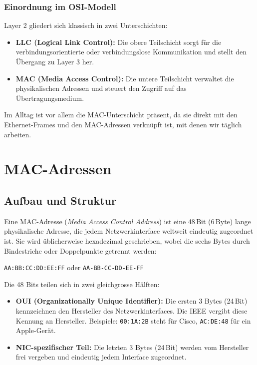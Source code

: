 \documentclass[11pt, oneside, numbers=nönddot]{scrbook}
\begin{document}
\subsubsection*{Einordnung im OSI-Modell}
Layer 2 gliedert sich klassisch in zwei Unterschichten:
\begin{itemize}
\item \textbf{LLC (Logical Link Control):} Die obere Teilschicht sorgt für die verbindungsorientierte oder verbindungslose Kommunikation und stellt den Übergang zu Layer 3 her.
\item \textbf{MAC (Media Access Control):} Die untere Teilschicht verwaltet die physikalischen Adressen und steuert den Zugriff auf das Übertragungsmedium.
\end{itemize}

Im Alltag ist vor allem die MAC-Unterschicht präsent, da sie direkt mit den Ethernet-Frames und den MAC-Adressen verknüpft ist, mit denen wir täglich arbeiten.

\newpage

\section{MAC-Adressen}
\subsection{Aufbau und Struktur}
Eine MAC-Adresse (\textit{Media Access Control Address}) ist eine 48\,Bit (6\,Byte) lange physikalische Adresse, die jedem Netzwerkinterface weltweit eindeutig zugeordnet ist. Sie wird üblicherweise hexadezimal geschrieben, wobei die sechs Bytes durch Bindestriche oder Doppelpunkte getrennt werden:

\begin{center}
\texttt{AA:BB:CC:DD:EE:FF} \quad oder \quad \texttt{AA-BB-CC-DD-EE-FF}
\end{center}

Die 48 Bits teilen sich in zwei gleichgrosse Hälften:
\begin{itemize}
\item \textbf{OUI (Organizationally Unique Identifier):} Die ersten 3 Bytes (24\,Bit) kennzeichnen den Hersteller des Netzwerkinterfaces. Die IEEE vergibt diese Kennung an Hersteller. Beispiele: \texttt{00:1A:2B} steht für Cisco, \texttt{AC:DE:48} für ein Apple-Gerät.
\item \textbf{NIC-spezifischer Teil:} Die letzten 3 Bytes (24\,Bit) werden vom Hersteller frei vergeben und eindeutig jedem Interface zugeordnet.
\end{itemize}
\end{document}
